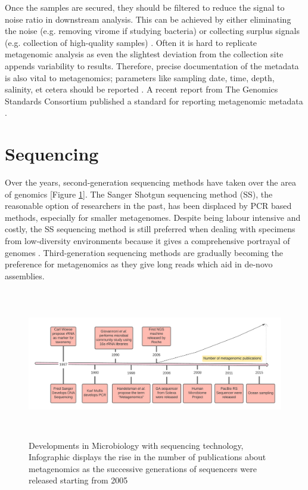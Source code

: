 Once the samples are secured, they should be filtered to reduce the signal to noise ratio in downstream analysis. This can be achieved by either eliminating the noise (e.g. removing virome if studying bacteria) or collecting surplus signals (e.g. collection of high-quality samples) \cite{ref12}. Often it is hard to replicate metagenomic analysis as even the slightest deviation from the collection site appends variability to results. Therefore, precise documentation of the metadata is also vital to metagenomics; parameters like sampling date, time, depth, salinity, et cetera should be reported \cite{ref12}. A recent report from The Genomics Standards Consortium published a standard for reporting metagenomic metadata \cite{ref12}.

\section{Sequencing}
Over the years, second-generation sequencing methods have taken over the area of genomics [Figure \ref{fig:figure2}]. The Sanger Shotgun sequencing method (SS), the reasonable option of researchers in the past, has been displaced by PCR based methods, especially for smaller metagenomes. Despite being labour intensive and costly, the SS sequencing method is still preferred when dealing with specimens from low-diversity environments because it gives a comprehensive portrayal of genomes \cite{ref12}. Third-generation sequencing methods are gradually becoming the preference for metagenomics as they give long reads which aid in de-novo assemblies.

\begin{figure}
  \centering
  \includegraphics[width=15cm, height=6.5cm]{../figures/Figure2.png}
  \caption[Development of Metagenomics]{Developments in Microbiology with sequencing technology, Infographic displays the rise in the number of publications about metagenomics as the successive generations of sequencers were released starting from 2005 \cite{ref11}}
  \label{fig:figure2}
\end{figure}

